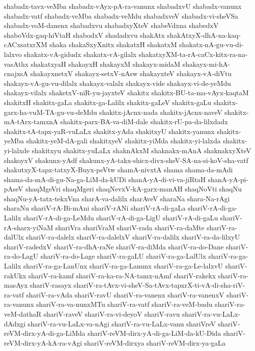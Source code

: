 {shabadx-tavx-veMba
shabadx-vAyx-pA-ra-vanunx
shabadxvU
shabadx-vanunx
shabadx-vatf
shabadx-veMba
shabadx-veMdu
shabadxveV
shabadx-vi-sheVSa
shabadx-voM-danenx
shabadxvu
shabadxyXteV
shabeVdxna
shabedxV
shaboVdx-gaq-hiVtaH
shabodxV
shadadxvu
shakAtx
shakAtxyX-dhA-na-kaq-cACxsatxrXM
shaka
shakaSxyXnitx
shakatxH
shakatxM
shakatx-nA-gu-vu-di-lalxvo
shakatx-vA-gidudx
shakatx-vA-gilalx
shakatxyXM-ta-rA-caCx-kitx-ra-na-vasAthx
shakatxyaH
shakayxH
shakayxM
shakayx-midaM
shakayx-mi-hA-cnajxsA
shakayxnetxV
shakayx-setxV-nAsw
shakayxteV
shakayx-vA-diVtu
shakayx-vA-gu-vu-dilalx
shakayx-valalx
shakayx-vide
shakayx-vi-de-yeMdu
shakayx-vilalx
shaketxV-niR-yu-jayxteV
shakitx
shakitx-BU-ta-ma-vAyx-kaqtaM
shakitxH
shakitx-gaLa
shakitx-ga-Lalilx
shakitx-gaLeV
shakitx-gaLu
shakitx-garx-ha-vuM-TA-gu-vu-deMdu
shakitx-jAcnx-nada
shakitx-jAcnx-naveV
shakitx-mA-tArx-tamxnA
shakitx-parx-BA-va-diM-dale
shakitx-rU-pa-da-lilxdadx
shakitx-tA-tapx-yaR-vuLaLx
shakitx-yAda
shakitxyU
shakitx-yanunx
shakitx-yeMba
shakitx-yeM-dA-gali
shakitxyeV
shakitx-yiMda
shakitx-yi-lalxda
shakitx-yi-lalxde
shakitxyu
shakitx-yuLaLx
shaknAkxM
shaknakx-mAnA
shaknakxyXteV
shakoyxV
shakunx-yAdf
shakunx-yA-takx-shicx-divx-sheV-SA-na-si-koV-sha-vatf
shakutxyX-tapx-tatxyX-Buyx-peVtw
shamA-nivxtA
shama
shama-da-mAdi
shama-da-mA-di-gu-Na-ga-LiM-da-kUDi
shanA-yA-di-vi-va-jiRtaH
shanA-yA-pi-pAseV
shaqMgeVri
shaqMgeri
shaqNevxV-kA-garx-manAH
shaqNoVti
shaqNu
shaqNu-yA-tatx-tekxVna
sharA-va-dalilx
sharAveV
sharaNa
shara-Na-rAgi
sharaNu
shariV-rA-Bi-mAni
shariV-rANi
shariV-rA-di-gaLa
shariV-rA-di-ga-Lalilx
shariV-rA-di-ga-LeMdu
shariV-rA-di-ga-LigU
shariV-rA-di-gaLu
shariV-rA-sharx-yiNaM
shariVra
shariVraM
shariV-rada
shariV-ra-daMte
shariV-ra-dalUlx
shariV-ra-dalelx
shariV-ra-dalelxV
shariV-ra-dalilx
shariV-ra-da-lilxyU
shariV-radedxV
shariV-ra-dhA-raNe
shariV-ra-diMda
shariV-ra-do-Dane
shariV-ra-do-LagU
shariV-ra-do-Lage
shariV-ra-gaLU
shariV-ra-ga-LalUlx
shariV-ra-ga-Lalilx
shariV-ra-ga-LanUnx
shariV-ra-ga-Lanunx
shariV-ra-ga-Le-lalxvU
shariV-rakUkx
shariV-ra-kamf
shariV-ra-ka-ra-NA-tamx-nAmf
shariV-rakekx
shariV-ra-masAyx
shariV-rasayx
shariV-ra-tAvx-vi-sheV-Sa-tAvx-tapxrX-ti-vA-di-sha-riV-ra-vatf
shariV-ra-vAda
shariV-ravU
shariV-ra-vanenx
shariV-ra-vanenxV
shariV-ra-vanunx
shariV-ra-va-nunxMTu
shariV-ra-vatf
shariV-ra-veM-budu
shariV-ra-veM-dathaR
shariV-raveV
shariV-ra-vi-deyoV
shariV-ravu
shariV-ra-vu-LaLx-dAdxgi
shariV-ra-vu-LaLx-va-nAgi
shariV-ra-vu-LaLx-vanu
shariVreV
shariV-reVM-dirx-yA-di-ga-LiMda
shariV-reVM-dirx-yA-di-ga-LiM-da-kU-Dida
shariV-reVM-dirx-yA-kA-ra-vAgi
shariV-reVM-dirxya
shariV-reVM-dirx-ya-gaLa
}
